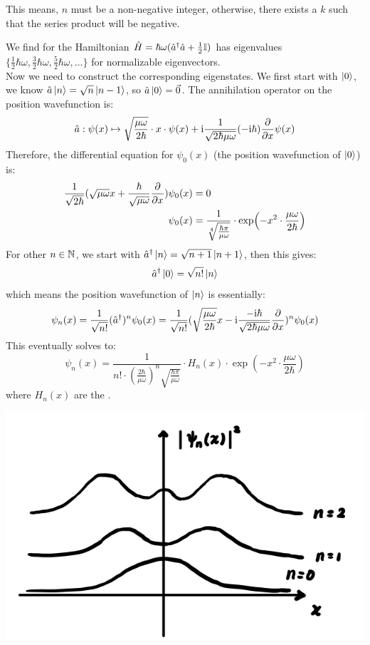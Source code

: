 This means, $n$ must be a non-negative integer, otherwise, there exists a $k$ such that the series product will be negative. \par
We find for the Hamiltonian $\hat{H} = \hbar \omega (\hat{a}^{\dagger} \hat{a} + \frac{1}{2}\mathbb{I})$ has eigenvalues $\{\frac{1}{2}\hbar\omega, \frac{3}{2}\hbar\omega, \frac{5}{2}\hbar\omega, \dots\}$ for normalizable eigenvectors. \\
Now we need to construct the corresponding eigenstates. We first start with $\ket{0}$, we know $\hat{a} \ket{n} = \sqrt{n}\ket{n-1}$, so $\hat{a}\ket{0} = \vec{0}$. The annihilation operator on the position wavefunction is:
$$\hat{a}: \psi(x) \mapsto \sqrt{\frac{\mu \omega}{2\hbar}} \cdot x \cdot \psi(x) + \mathrm{i} \frac{1}{\sqrt{2\hbar \mu \omega}} (-\mathrm{i} \hbar)\pdv{x}\psi(x)$$
Therefore, the differential equation for $\psi_0(x)$ (the position wavefunction of $\ket{0}$) is:
\begin{align*}
    \frac{1}{\sqrt{2\hbar}}(\sqrt{\mu\omega}x + \frac{\hbar}{\sqrt{\mu\omega}}\pdv{x})\psi_0(x) &= 0 \\
    \psi_0(x) &= \frac{1}{\sqrt[4]{\frac{\hbar\pi}{\mu\omega}}} \cdot \exp(-x^2 \cdot \frac{\mu\omega}{2\hbar})
\end{align*}
For other $n \in \mathbb{N}$, we start with $\hat{a}^{\dagger}\ket{n} = \sqrt{n+1}\ket{n+1}$, then this gives:
$$\hat{a}^{\dagger}\ket{0} = \sqrt{n!}\ket{n}$$
which means the position wavefunction of $\ket{n}$ is essentially:
$$\psi_n(x) = \frac{1}{\sqrt{n!}} (\hat{a}^{\dagger})^n \psi_0(x) = \frac{1}{\sqrt{n!}} (\sqrt{\frac{\mu\omega}{2\hbar}}x - \mathrm{i} \frac{-\mathrm{i} \hbar}{\sqrt{2\hbar\mu\omega}}\pdv{x})^n \psi_0(x)$$
This eventually solves to:
$$\psi_n(x) = \frac{1}{n! \cdot (\frac{2\hbar}{\mu\omega})^n\sqrt{\frac{\hbar\pi}{\mu\omega}}} \cdot H_n(x) \cdot \exp(-x^2 \cdot \frac{\mu\omega}{2\hbar})$$
where $H_n(x)$ are the .
\begin{center}
    \includegraphics[scale = 1]{ho-prob-dist.png}
\end{center}
